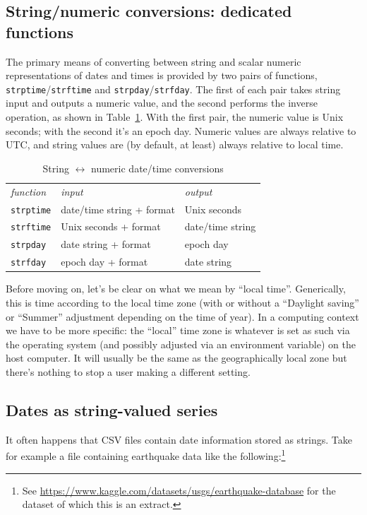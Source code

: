 \subsection{String/numeric conversions: dedicated functions}

The primary means of converting between string and scalar numeric
representations of dates and times is provided by two pairs of
functions, \texttt{strptime}/\texttt{strftime} and
\texttt{strpday}/\texttt{strfday}. The first of each pair takes string
input and outputs a numeric value, and the second performs the inverse
operation, as shown in Table~\ref{tab:timeconv}. With the first pair,
the numeric value is Unix seconds; with the second it's an epoch day.
Numeric values are always relative to UTC, and string values are (by
default, at least) always relative to local time.

\begin{table}[htbp]
  \centering
  \begin{tabular}{lll}
    \textit{function} & \textit{input} & \textit{output} \\[6pt]
    \texttt{strptime} & date/time string + format & Unix seconds \\
    \texttt{strftime} & Unix seconds + format & date/time string \\[4pt]
    \texttt{strpday}  & date string + format & epoch day \\
    \texttt{strfday}  & epoch day + format & date string
  \end{tabular}
  \caption{String $\longleftrightarrow$ numeric date/time conversions}
  \label{tab:timeconv}
\end{table}

Before moving on, let's be clear on what we mean by ``local time''.
Generically, this is time according to the local time zone (with or
without a ``Daylight saving'' or ``Summer'' adjustment depending on
the time of year). In a computing context we have to be more specific:
the ``local'' time zone is whatever is set as such via the operating
system (and possibly adjusted via an environment variable) on the host
computer. It will usually be the same as the geographically local zone
but there's nothing to stop a user making a different setting.

\subsection{Dates as string-valued series}

It often happens that CSV files contain date information stored as
strings. Take for example a file containing earthquake data like the
following:\footnote{See
  \url{https://www.kaggle.com/datasets/usgs/earthquake-database} for
  the dataset of which this is an extract.}

